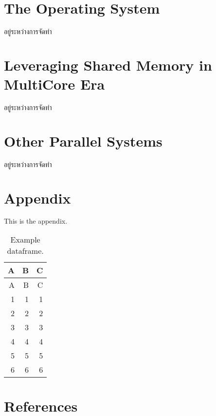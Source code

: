 \documentclass[
  notoc %
]{tufte-book}
\begin{document}
\hypertarget{sec:os}{%
\chapter{The Operating System}\label{sec:os}}

อยู่ระหว่างการจัดทำ

\hypertarget{sec:sharedmem}{%
\chapter{Leveraging Shared Memory in MultiCore
Era}\label{sec:sharedmem}}

อยู่ระหว่างการจัดทำ

\hypertarget{sec:parallelsys}{%
\chapter{Other Parallel Systems}\label{sec:parallelsys}}

อยู่ระหว่างการจัดทำ

\hypertarget{appendix}{%
\chapter*{Appendix}\label{appendix}}

This is the appendix.

\hypertarget{tbl:example_dataframe}{}
\begin{longtable}[]{@{}rrr@{}}
\caption{\label{tbl:example_dataframe}Example dataframe.}\tabularnewline
\toprule
A & B & C \\
\midrule
\endfirsthead
\toprule
A & B & C \\
\midrule
\endhead
1 & 1 & 1 \\
2 & 2 & 2 \\
3 & 3 & 3 \\
4 & 4 & 4 \\
5 & 5 & 5 \\
6 & 6 & 6 \\
\bottomrule
\end{longtable}

\hypertarget{references}{%
\chapter*{References}\label{references}}

\backmatter
\end{document}

